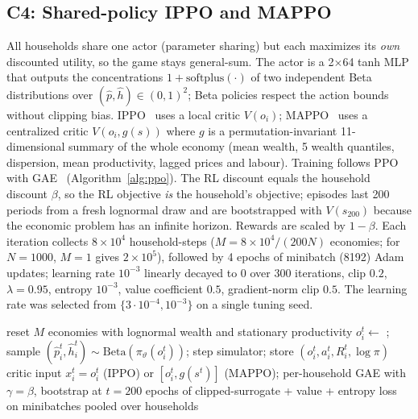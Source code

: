 \subsection{C4: Shared-policy IPPO and MAPPO}
All households share one actor (parameter sharing) but each maximizes its \emph{own} discounted utility, so the game
stays general-sum. The actor is a 2$\times$64 tanh MLP that outputs the concentrations $1+\mathrm{softplus}(\cdot)$ of
two independent Beta distributions over $(\hat p,\hat h)\in(0,1)^2$; Beta policies respect the action bounds without
clipping bias. IPPO~\cite{ippo} uses a local critic $V(o_i)$; MAPPO~\cite{mappo} uses a centralized critic
$V(o_i,g(s))$ where $g$ is a permutation-invariant 11-dimensional summary of the whole economy (mean wealth,
5 wealth quantiles, dispersion, mean productivity, lagged prices and labour). Training follows PPO~\cite{ppo}
with GAE~\cite{gae} (Algorithm~\ref{alg:ppo}). The RL discount equals the household discount $\beta$, so the RL objective
\emph{is} the household's objective; episodes last 200 periods from a fresh lognormal draw and are bootstrapped with
$V(s_{200})$ because the economic problem has an infinite horizon. Rewards are scaled by $1-\beta$. Each iteration
collects $8\times10^4$ household-steps ($M=8\times10^4/(200N)$ economies; for $N=1000$, $M=1$ gives $2\times10^5$),
followed by 4 epochs of minibatch (8192) Adam updates; learning rate $10^{-3}$ linearly decayed to 0 over 300
iterations, clip $0.2$, $\lambda=0.95$, entropy $10^{-3}$, value coefficient $0.5$, gradient-norm clip $0.5$.
The learning rate was selected from $\{3\cdot10^{-4},10^{-3}\}$ on a single tuning seed.

\begin{algorithm}[t]
\caption{Shared-policy IPPO / MAPPO for $N$ households}\label{alg:ppo}
\small
\begin{algorithmic}[1]
  \State reset $M$ economies with lognormal wealth and stationary productivity
   
    \State $o_i^t\gets$ ; sample $(\hat p_i^t,\hat h_i^t)\sim\mathrm{Beta}(\pi_\vartheta(o_i^t))$; step simulator; store $(o_i^t,a_i^t,R_i^t,\log\pi)$
  \EndFor
  \State critic input $x_i^t=o_i^t$ (IPPO) or $[o_i^t,g(s^t)]$ (MAPPO); per-household GAE with $\gamma=\beta$, bootstrap at $t=200$
   epochs of clipped-surrogate + value + entropy loss on minibatches pooled over households
\EndFor
\end{algorithmic}
\end{algorithm}

